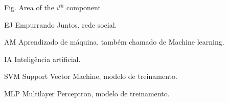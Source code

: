 \begin{siglas}
  \item[Fig.] Area of the $i^{th}$ component
  \item[EJ] Empurrando Juntos, rede social.
  \item[AM] Aprendizado de máquina, também chamado de Machine learning.
  \item[IA] Inteligência artificial.
  \item[SVM] Support Vector Machine, modelo de treinamento.
  \item[MLP] Multilayer Perceptron, modelo de treinamento.
\end{siglas}
